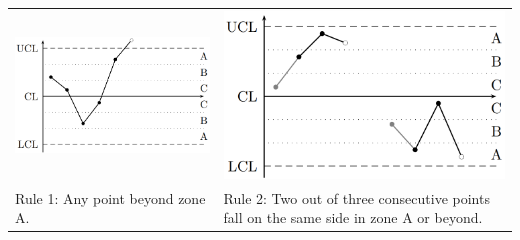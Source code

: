 \begin{table}[H]
  \setlength{\tabcolsep}{0.2em}
  \scriptsize
  \begin{tabular}{p{}@{\hskip 1em}p{}}
    \includegraphics[width=\linewidth]{Pics/3.1.1.png}& \includegraphics[width=\linewidth]{Pics/3.1.2.png} \\
    Rule 1: Any point beyond zone A. &
    Rule 2: Two out of three consecutive points fall on the same side in zone A or beyond.\\

\end{tabular}
\end{table}
